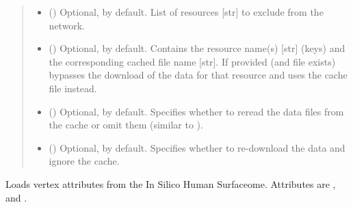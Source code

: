 \documentclass[letterpaper,10pt,english]{sphinxmanual}
\begin{document}
\begin{fulllineitems}
\begin{fulllineitems}
\begin{quote}
\begin{description}
\begin{itemize}
\item {} 
 () \textendash{} Optional, \sphinxcode{\sphinxupquote{{[}{]}}} by default. List of resources {[}str{]} to
exclude from the network.

\item {} 
 () \textendash{} Optional, \sphinxcode{\sphinxupquote{\{\}}} by default. Contains the resource name(s)
{[}str{]} (keys) and the corresponding cached file name {[}str{]}.
If provided (and file exists) bypasses the download of the
data for that resource and uses the cache file instead.

\item {} 
 () \textendash{} Optional,  by default. Specifies whether to reread
the data files from the cache or omit them (similar to
).

\item {} 
 () \textendash{} Optional,  by default. Specifies whether to
re-download the data and ignore the cache.

\end{itemize}

\end{description}\end{quote}

\end{fulllineitems}


\begin{fulllineitems}
\label{\detokenize{main:pypath.main.PyPath.load_signor_ptms}}
\end{fulllineitems}


\begin{fulllineitems}
\label{\detokenize{main:pypath.main.PyPath.load_surfaceome_attrs}}
Loads vertex attributes from the In Silico Human Surfaceome.
Attributes are ,  and
.


\end{fulllineitems}
\end{fulllineitems}
\end{document}

